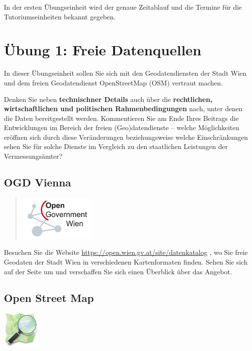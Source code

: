 \documentclass[a4paper,12pt,ngerman]{sphinxmanual}
\begin{document}
In der ersten Übungseinheit wird der genaue Zeitablauf und die Termine für die Tutoriumseinheiten bekannt gegeben.


\chapter{Übung 1: Freie Datenquellen}
\label{uebung1:ubung-1-freie-datenquellen}\label{uebung1::doc}
In dieser Übungseinheit sollen Sie sich mit den Geodatendiensten der Stadt Wien und dem freien Geodatendienst OpenStreetMap (OSM) vertraut machen.

Denken Sie neben \textbf{technischner Details} auch über die \textbf{rechtlichen, wirtschaftlichen und politischen Rahmenbedingungen} nach, unter denen die Daten bereitgestellt werden. Kommentieren Sie am Ende Ihres Beitrags die Entwicklungen im Bereich der freien (Geo)datendienste – welche Möglichkeiten eröffnen sich durch diese Veränderungen beziehungsweise welche Einschränkungen sehen Sie für solche Dienste im Vergleich zu den staatlichen Leistungen der Vermessungsämter?


\section{OGD Vienna}
\label{uebung1:ogd-vienna}\begin{quote}

\includegraphics[width=10em]{ogdvienna.jpg}
\end{quote}

Besuchen Sie die Website \href{https://open.wien.gv.at/site/datenkatalog}{https://open.wien.gv.at/site/datenkatalog} , wo Sie freie Geodaten der Stadt Wien in verschiedenen Kartenformaten finden.
Sehen Sie sich auf der Seite um und verschaffen Sie sich einen Überblick über das Angebot.


\section{Open Street Map}
\label{uebung1:open-street-map}
\includegraphics[width=5em]{osm_logo.png}
\end{document}
